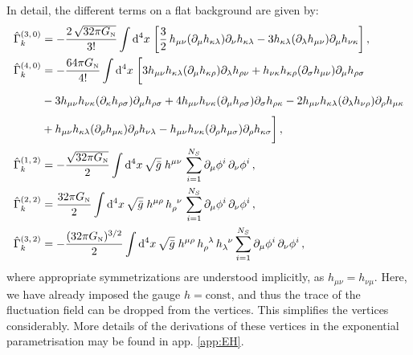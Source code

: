 \documentclass[11pt]{book} %
\newcommand\GNewton{ G_{\scriptscriptstyle{\mathrm{N}}} }
\numberwithin{equation}{chapter}
\begin{document}
In detail, the different terms on a flat background are given by:
\begin{align}
  \hat \Gamma^{(3,\, 0)}_k &= -\frac{ 2 \, \sqrt{32\pi \GNewton} }{ 3! } \int \mathrm d^4x \;
  \bigg[
    \frac{3}{2} \, h_{\mu\nu}(\partial_{\mu}h_{\kappa\lambda})\partial_{\nu}h_{\kappa\lambda}
    - 3 h_{\kappa \lambda}(\partial_{\lambda}h_{\mu\nu})\partial_{\mu}h_{\nu\kappa}
  \bigg] \,, \label{GammaG3} \\
  \hat \Gamma^{(4,\, 0)}_k &= - \frac{ 64\pi \GNewton }{ 4! }  \int \mathrm d^4x \;
  \bigg[
    3h_{\mu\nu}h_{\kappa\lambda} (\partial_{\mu}h_{\kappa\rho})\partial_{\lambda}h_{\rho\nu}
    + h_{\nu\kappa}h_{\kappa\rho}(\partial_{\sigma}h_{\mu\nu})\partial_{\mu}h_{\rho\sigma} \nonumber \\
    & \vphantom{ \frac{ 64\pi \GNewton }{ 4! } } - 3 h_{\mu\nu}h_{\nu\kappa}(\partial_{\kappa}h_{\rho\sigma})\partial_{\mu}h_{\rho\sigma}
    + 4 h_{\mu\nu}h_{\nu\kappa}(\partial_{\mu}h_{\rho\sigma})\partial_{\sigma}h_{\rho\kappa}
    - 2 h_{\mu\nu}h_{\kappa \lambda}(\partial_{\lambda}h_{\nu\rho})\partial_{\rho}h_{\mu\kappa} \nonumber\\
    & \vphantom{ \frac{ 64\pi \GNewton }{ 4! } } +  h_{\mu\nu}h_{\kappa\lambda}(\partial_{\rho}h_{\mu\kappa}) \partial_{\rho}h_{\nu\lambda}
    -  h_{\mu\nu}h_{\nu\kappa}(\partial_{\rho}h_{\mu\sigma})\partial_{\rho}h_{\kappa\sigma}
  \bigg] \,, \label{GammaG4}\\
  \hat \Gamma^{(1,\, 2)}_k &= - \frac{\sqrt{32 \pi  \GNewton}}{2}   \int \mathrm d^4x \, \sqrt{\bar{g}} \; h^{\mu \nu} \, \sum_{i=1}^{N_S} \partial_{\mu}\phi^i \, \partial_{\nu}\phi^i \,, \label{Gammag3} \\
  \hat \Gamma^{(2,\, 2)}_k &=   \frac{ 32 \pi  \GNewton}{2 }        \int \mathrm d^4x \, \sqrt{\bar{g}} \; h^{\mu \rho} \, h_{\rho}^{\phantom{\rho}\nu} \, \sum_{i=1}^{N_S} \partial_{\mu}\phi^i \, \partial_{\nu}\phi^i \,, \label{Gammag4} \\
  \hat \Gamma^{(3,\, 2)}_k &= - \frac{(32 \pi  \GNewton)^{3/2}}{2}  \int \mathrm d^4x \, \sqrt{\bar{g}} \; h^{\mu \rho} \, h_{\rho}^{\phantom{\rho}\lambda} \, h_{\lambda}^{\phantom{\lambda}\nu}
  \sum_{i=1}^{N_S}\partial_{\mu}\phi^i \, \partial_{\nu}\phi^i \,, \label{Gammag5}
\end{align}
where appropriate symmetrizations are understood implicitly, as $h_{\mu \nu} = h_{\nu \mu}$.
Here, we have already imposed the gauge $h = \mathrm{const}$,
and thus the trace of the fluctuation field can be dropped from the vertices.
This simplifies the vertices considerably. More details of the derivations of these vertices
in the exponential parametrisation may be found in app. \ref{app:EH}.
\end{document}
